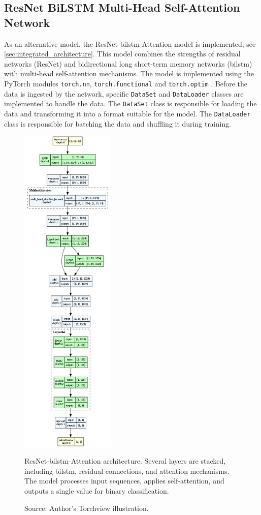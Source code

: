 \subsection{ResNet BiLSTM Multi-Head Self-Attention Network}
As an alternative model, the ResNet-\gls{bilstm}-Attention model is implemented, see \autoref{sec:integrated_architecture}. This model combines the strengths of residual networks (ResNet) and bidirectional long short-term memory networks (\gls{bilstm}) with multi-head self-attention mechanisms. The model is implemented using the PyTorch modules \texttt{torch.nn}, \texttt{torch.functional} and \texttt{torch.optim} \autocite{PyTorch}. Before the data is ingested by the network, specific \texttt{DataSet} and \texttt{DataLoader} classes are implemented to handle the data. The \texttt{DataSet} class is responsible for loading the data and transforming it into a format suitable for the model. The \texttt{DataLoader} class is responsible for batching the data and shuffling it during training.

\begin{figure}[htbp]
  \centering
  \includegraphics[width=0.4\textwidth]{figures/architecture.png}
  \caption[ResNet-BiLSTM-Attention Architecture]{ResNet-\gls{bilstm}-Attention architecture. Several layers are stacked, including \gls{bilstm}, residual connections, and attention mechanisms. The model processes input sequences, applies self-attention, and outputs a single value for binary classification.}
  \label{fig:architecture}
  \caption*{Source: Author's Torchview illustration.}
\end{figure}

